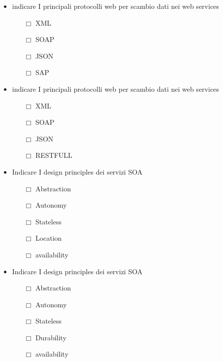 \documentclass[10pt,twocolumn]{article}
\begin{document}
\begin{itemize}
    \item indicare I principali protocolli web per scambio dati nei web services
          \begin{itemize}
              \item[$\Box$] XML
              \item[$\Box$] SOAP
              \item[$\Box$] JSON
              \item[$\Box$] SAP
          \end{itemize}
\end{itemize}
\begin{itemize}
    \item indicare I principali protocolli web per scambio dati nei web services
          \begin{itemize}
              \item[$\Box$] XML
              \item[$\Box$] SOAP
              \item[$\Box$] JSON
              \item[$\Box$] RESTFULL
          \end{itemize}
\end{itemize}
\begin{itemize}
    \item Indicare I design principles dei servizi SOA
          \begin{itemize}
              \item[$\Box$] Abstraction
              \item[$\Box$] Autonomy
              \item[$\Box$] Stateless
              \item[$\Box$] Location
              \item[$\Box$] availability
          \end{itemize}
\end{itemize}
\begin{itemize}
    \item Indicare I design principles dei servizi SOA
          \begin{itemize}
              \item[$\Box$] Abstraction
              \item[$\Box$] Autonomy
              \item[$\Box$] Stateless
              \item[$\Box$] Durability
              \item[$\Box$] availability
          \end{itemize}
\end{itemize}
\end{document}
